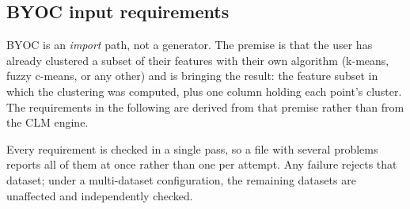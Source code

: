 \documentclass[a4paper,11pt]{article}
\begin{document}
\subsection{BYOC input requirements}

\noindent BYOC is an \emph{import} path, not a generator. The premise is that the user has already clustered a subset of their features with their own algorithm (k-means, fuzzy c-means, or any other) and is bringing the result: the feature subset in which the clustering was computed, plus one column holding each point's cluster. The requirements in the following are derived from that premise rather than from the CLM engine.

\vspace{0.4em}
\noindent Every requirement is checked in a single pass, so a file with several problems reports all of them at once rather than one per attempt. Any failure rejects that dataset; under a multi-dataset configuration, the remaining datasets are unaffected and independently checked.
\end{document}
